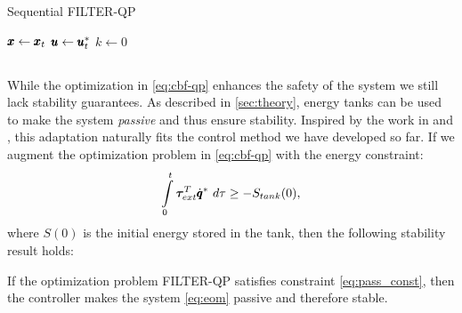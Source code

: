 \begin{algorithm}
\caption{Sequential FILTER-QP \label{algo:sequential_qp}}
$\pmb{x} \gets \pmb{x}_t$\;
$\pmb{u} \gets \pmb{u}^*_t$\;
$k \gets 0$\;
\end{algorithm}

\subsection{}
While the optimization in \eqref{eq:cbf-qp} enhances the safety of the system we still lack stability guarantees. As described in \sect \ref{sec:theory}, energy tanks can be used to make the system \emph{passive} and thus ensure stability. Inspired by the work in \cite{benzi2021optimization} and \cite{shahriari2018valve}, this adaptation naturally fits the control method we have developed so far. If we augment the optimization problem in \eqref{eq:cbf-qp} with the energy constraint:
\begin{equation}\label{eq:pass_const}
    \int\limits_{0}^{t} \boldsymbol{\tau}_{ext}^T \dconfigRobotDesired \ d\tau \geq -S_{tank}(0),
\end{equation}
where $S(0)$ is the initial energy stored in the tank, then the following stability result holds:

\begin{theorem}
If the optimization problem FILTER-QP satisfies constraint \eqref{eq:pass_const}, then the controller makes the system \eqref{eq:eom} passive and therefore stable. 
\end{theorem}

